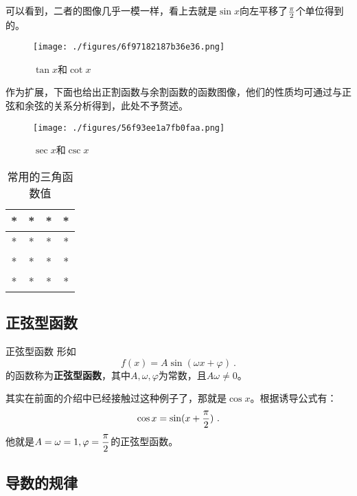 可以看到，二者的图像几乎一模一样，看上去就是$\sin x$向左平移了${\pi\over2}$个单位得到的。

\begin{figure}[ht]
\centering
\texttt{[image: ./figures/6f97182187b36e36.png]}
\caption{$\tan x$和$\cot x$} \label{fig_HsTFFv_3}
\end{figure}

作为扩展，下面也给出正割函数与余割函数的函数图像，他们的性质均可通过与正弦和余弦的关系分析得到，此处不予赘述。

\begin{figure}[ht]
\centering
\texttt{[image: ./figures/56f93ee1a7fb0faa.png]}
\caption{$\sec x$和$\csc x$} \label{fig_HsTFFv_2}
\end{figure}

\begin{table}[ht]
\centering
\caption{常用的三角函数值}\label{tab_HsTFFv1}
\begin{tabular}{|c|c|c|c|}
\hline
* & * & * & * \\
\hline
* & * & * & * \\
\hline
* & * & * & * \\
\hline
* & * & * & * \\
\hline
\end{tabular}
\end{table}

\subsection{正弦型函数}

\begin{definition}{正弦型函数}
形如
\begin{equation}
f(x)=A\sin(\omega x+\varphi)~.
\end{equation}
的函数称为\textbf{正弦型函数}，其中$A,\omega,\varphi$为常数，且$A\omega\neq0$。
\end{definition}
其实在前面的介绍中已经接触过这种例子了，那就是$\cos x$。根据诱导公式有：
\begin{equation}
\cos x=\sin(x+{\pi\over2})~.
\end{equation}
他就是$\displaystyle A=\omega=1,\varphi={\pi\over2}$的正弦型函数。


\subsection{导数的规律}